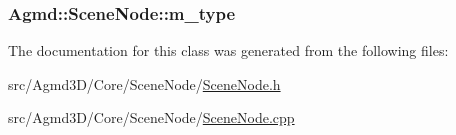 \hypertarget{class_agmd_1_1_scene_node_a1322779a116c1ae5df21e2e1920d3ba0}{
\subsubsection[{m\+\_\+type}]{ Agmd\+::\+Scene\+Node\+::m\+\_\+type\hspace{0.3cm}{\ttfamily [protected]}}}\label{class_agmd_1_1_scene_node_a1322779a116c1ae5df21e2e1920d3ba0}


The documentation for this class was generated from the following files\+:\begin{DoxyCompactItemize}
\item 
src/\+Agmd3\+D/\+Core/\+Scene\+Node/\hyperlink{_scene_node_8h}{Scene\+Node.\+h}\item 
src/\+Agmd3\+D/\+Core/\+Scene\+Node/\hyperlink{_scene_node_8cpp}{Scene\+Node.\+cpp}\end{DoxyCompactItemize}
